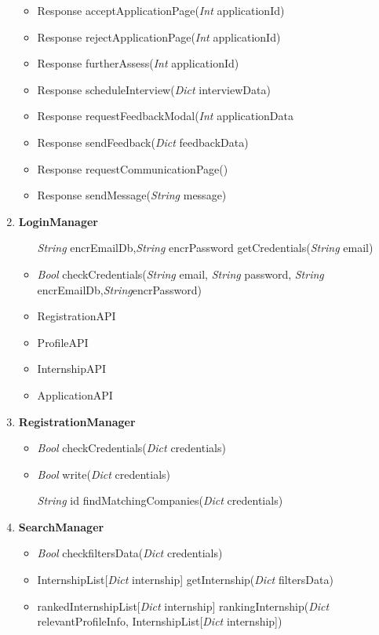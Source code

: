 \begin{enumerate}
\begin{itemize}
            \item Response acceptApplicationPage(\textit{Int} applicationId)
            \item Response rejectApplicationPage(\textit{Int} applicationId)
            \item Response furtherAssess(\textit{Int} applicationId)
            \item Response scheduleInterview(\textit{Dict} interviewData)
            \item Response requestFeedbackModal(\textit{Int} applicationData
            \item Response sendFeedback(\textit{Dict} feedbackData)
            \item Response requestCommunicationPage()
            \item Response sendMessage(\textit{String} message)

        \end{itemize} 

    \item \textbf{LoginManager}
        \begin{itemize}
            \item [\textit{String} encrEmailDb,\textit{String} encrPassword] getCredentials(\textit{String} email)
            \item \textit{Bool} checkCredentials(\textit{String} email, \textit{String} password, \textit{String} encrEmailDb,\textit{String}encrPassword)
            \item RegistrationAPI
            \item ProfileAPI
            \item InternshipAPI
            \item ApplicationAPI
    \end{itemize}
    \item \textbf{RegistrationManager}
        \begin{itemize}
            \item \textit{Bool} checkCredentials(\textit{Dict} credentials)
            \item \textit{Bool} write(\textit{Dict} credentials)
            \item [\textit{String} id] findMatchingCompanies(\textit{Dict} credentials)
        \end{itemize}
    \item \textbf{SearchManager}
        \begin{itemize}
            \item \textit{Bool} checkfiltersData(\textit{Dict} credentials)
            \item InternshipList[\textit{Dict} internship] getInternship(\textit{Dict} filtersData)
            \item rankedInternshipList[\textit{Dict} internship] rankingInternship(\textit{Dict} relevantProfileInfo, InternshipList[\textit{Dict} internship]) 
        \end{itemize}
    


\end{enumerate}
